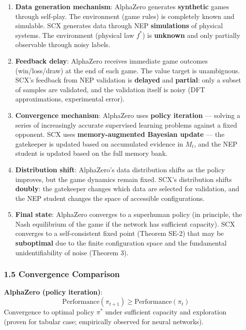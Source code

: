 \documentclass[
  12pt,
]{article}
\begin{document}
\begin{enumerate}
\def\labelenumi{\arabic{enumi}.}
\item
  \textbf{Data generation mechanism}: AlphaZero generates
  \textbf{synthetic} games through self-play. The environment (game
  rules) is completely known and simulable. SCX generates data through
  NEP \textbf{simulations} of physical systems. The environment
  (physical law \(f^*\)) is \textbf{unknown} and only partially
  observable through noisy labels.
\item
  \textbf{Feedback delay}: AlphaZero receives immediate game outcomes
  (win/loss/draw) at the end of each game. The value target is
  unambiguous. SCX's feedback from NEP validation is \textbf{delayed}
  and \textbf{partial}: only a subset of samples are validated, and the
  validation itself is noisy (DFT approximations, experimental error).
\item
  \textbf{Convergence mechanism}: AlphaZero uses \textbf{policy
  iteration} --- solving a series of increasingly accurate supervised
  learning problems against a fixed opponent. SCX uses
  \textbf{memory-augmented Bayesian update} --- the gatekeeper is
  updated based on accumulated evidence in \(M_t\), and the NEP student
  is updated based on the full memory bank.
\item
  \textbf{Distribution shift}: AlphaZero's data distribution shifts as
  the policy improves, but the game dynamics remain fixed. SCX's
  distribution shifts \textbf{doubly}: the gatekeeper changes which data
  are selected for validation, and the NEP student changes the space of
  accessible configurations.
\item
  \textbf{Final state}: AlphaZero converges to a superhuman policy (in
  principle, the Nash equilibrium of the game if the network has
  sufficient capacity). SCX converges to a self-consistent fixed point
  (Theorem SE-2) that may be \textbf{suboptimal} due to the finite
  configuration space and the fundamental unidentifiability of noise
  (Theorem 3).
\end{enumerate}

\subsubsection{1.5 Convergence Comparison}\label{convergence-comparison}

\textbf{AlphaZero (policy iteration)}:
\[\text{Performance}(\pi_{t+1}) \geq \text{Performance}(\pi_t)\]
Convergence to optimal policy \(\pi^*\) under sufficient capacity and
exploration (proven for tabular case; empirically observed for neural
networks).
\end{document}
